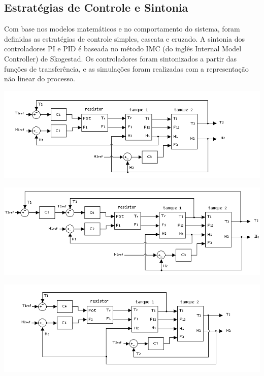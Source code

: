 \documentclass[a0,portrait]{a0poster}
\begin{document}
\begin{multicols}{2}
\section*{Estratégias de Controle e Sintonia}

\color{Black}

Com base nos modelos matemáticos e no comportamento do sistema, foram definidas as estratégias de controle simples, cascata e cruzado. A sintonia dos controladores PI e PID é baseada no método IMC (do inglês Internal Model Controller) de Skogestad. Os controladores foram sintonizados a partir das funções de transferência, e as simulações foram realizadas com a representação não linear do processo. 

\begin{center}\vspace{5cm}
\includegraphics[width=0.75\linewidth]{simples}
\end{center}

\begin{center}\vspace{0.5cm}
\includegraphics[width=0.75\linewidth]{cascata}
\end{center}

\begin{center}
\includegraphics[width=0.75\linewidth]{cruzado}
\end{center}




\end{multicols}
\end{document}
